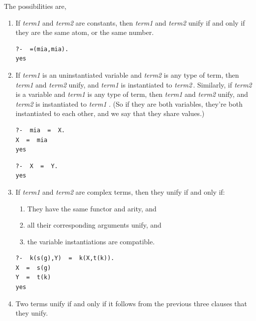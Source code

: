 \documentclass[thesis-solanki.tex]{subfiles}
\providecommand\metaSyntacticVariable[1]{\textsl{\ttfamily #1}}
\providecommand\mSV{\metaSyntacticVariable}
\begin{document}
The possibilities are,
\begin{enumerate}
\item If \mSV{term1} and \mSV{term2} are constants, then \mSV{term1} and \mSV{term2} unify if and only if they
  are the same atom, or the same number.
\par
\begin{verbatim}
?-  =(mia,mia).
yes
\end{verbatim}


\item If \mSV{term1} is an uninstantiated variable and \mSV{term2} is any type of term, then \mSV{term1}
  and \mSV{term2} unify, and \mSV{term1} is instantiated to \mSV{term2}\,.
  Similarly, if \mSV{term2} is a variable and \mSV{term1} is any type of term, then \mSV{term1} and \mSV{term2}
  unify, and \mSV{term2} is instantiated to \mSV{term1} . (So if they are both 
variables, they're both instantiated to each other, and we say that they share values.)
\par
\begin{verbatim}
?-  mia  =  X.
X  =  mia
yes
\end{verbatim}

\begin{verbatim}
?-  X  =  Y.
yes
\end{verbatim}


\item If \mSV{term1} and \mSV{term2} are complex terms, then they unify if and only if:

\begin{enumerate}
\item They have the same functor and arity, and

\item all their corresponding arguments unify, and

\item the variable instantiations are compatible.
\end{enumerate}

\par
\begin{verbatim}
?-  k(s(g),Y)  =  k(X,t(k)).
X  =  s(g)
Y  =  t(k)
yes
\end{verbatim}



\item Two terms unify if and only if it follows from the previous three clauses that they unify.
\end{enumerate}
\end{document}
